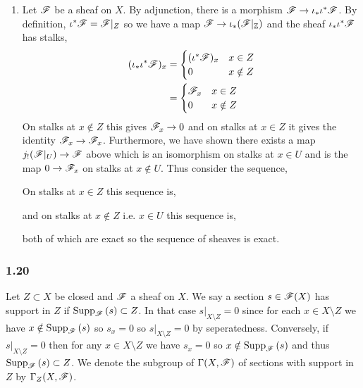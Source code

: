 \documentclass[12pt]{article}
\begin{document}
\begin{enumerate}
\item Let $\mathscr{F}$ be a sheaf on $X$. By adjunction, there is a morphism $\mathscr{F} \to \iota_* \iota^* \mathscr{F}$.  By definition, $\iota^* \mathscr{F} = \mathscr{F}|_Z$ so we have a map $\mathscr{F} \to \iota_* (\mathscr{F} |_{\mathbb{Z}})$ and the sheaf $\iota_* \iota^* \mathscr{F}$ has stalks,
\begin{align*}
(\iota_* \iota^* \mathscr{F})_x & = 
\begin{cases}
(\iota^* \mathscr{F})_x & x \in Z
\\
0 & x \notin Z
\end{cases}
\\
& = 
\begin{cases}
\mathscr{F}_x & x \in Z
\\
0 & x \notin Z
\end{cases}
\end{align*}
On stalks at $x \notin Z$ this gives $\mathscr{F}_x \to 0$ and on stalks at $x \in Z$ it gives the identity $\mathscr{F}_x \to \mathscr{F}_x$. Furthermore, we have shown there exists a map $j_! (\mathscr{F} |_U) \to \mathscr{F}$ above which is an isomorphism on stalks at $x \in U$ and is the map $0 \to \mathscr{F}_x$ on stalks at $x \notin U$. Thus consider the sequence,
\begin{center}
\end{center}
On stalks at $x \in Z$ this sequence is,
\begin{center}
\end{center}
and on stalks at $x \notin Z$ i.e. $x \in U$ this sequence is,
\begin{center}
\end{center}
both of which are exact so the sequence of sheaves is exact.
\end{enumerate}

\subsubsection{1.20}

Let $Z \subset X$ be closed and $\mathscr{F}$ a sheaf on $X$. We say a section $s \in \mathscr{F}(X)$ has support in $Z$ if $\mathrm{Supp}_{\mathscr{F}}\left(s \right) \subset Z$. In that case $s |_{X \setminus Z} = 0$ since for each $x \in X \setminus Z$ we have $x \notin \mathrm{Supp}_{\mathscr{F}}\left(s \right)$ so $s_x = 0$ so $s |_{X \setminus Z} = 0$ by seperatedness. Conversely, if $s|_{X \setminus Z} = 0$ then for any $x \in X \setminus Z$ we have $s_x = 0$ so $x \notin \mathrm{Supp}_{\mathscr{F}}\left(s \right)$ and thus $\mathrm{Supp}_{\mathscr{F}}\left(s \right) \subset Z$. We denote the subgroup of $\Gamma(X, \mathscr{F})$ of sections with support in $Z$ by $\Gamma_Z(X, \mathscr{F})$.
\end{document}
